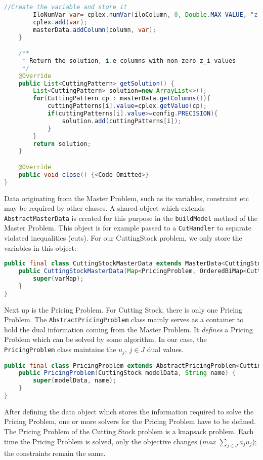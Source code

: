 \documentclass[a4paper]{article}
\newenvironment{myblock}[1]{%
    \tcolorbox[beamer,%
    noparskip,breakable,
    colback=lightBlueCodeBlock,colframe=darkBlueCodeBlock,%
    colbacklower=darkBlueCodeBlock!75!lightBlueCodeBlock,%
    coltitle=blueTitleCodeBlock,
    title=#1]}%
    {\endtcolorbox}
\newcommand{\code}[1]{\lstinline[language=java, style=seminar]!#1!}
\begin{document}
\begin{myblock}{Master}
\begin{lstlisting}[language=java, style=eclipseArticle, xleftmargin=2em]
		//Create the variable and store it
		IloNumVar var= cplex.numVar(iloColumn, 0, Double.MAX_VALUE, "z_"+","+masterData.getNrColumns());
		cplex.add(var);
		masterData.addColumn(column, var);
	}

	/**
	 * Return the solution, i.e columns with non-zero z_i values
	 */
	@Override
	public List<CuttingPattern> getSolution() {
		List<CuttingPattern> solution=new ArrayList<>();
		for(CuttingPattern cp : masterData.getColumns()){
			cuttingPatterns[i].value=cplex.getValue(cp);
			if(cuttingPatterns[i].value>=config.PRECISION){
				solution.add(cuttingPatterns[i]);
			}
		}
		return solution;
	}

	@Override
	public void close() {<Code Omitted>}	
}
\end{lstlisting}
\end{myblock}
Data originating from the Master Problem, such as its variables, constraint etc may be required by other classes. A shared object which extends \code{AbstractMasterData} is created for this purpose in the \code{buildModel} method of the Master Problem. This object is for example passed to a \code{CutHandler} to separate violated inequalities (cuts). For our CuttingStock problem, we only store the variables in this object:

\begin{myblock}{CuttingStockMasterData}
\begin{lstlisting}[language=java, style=eclipseArticle, xleftmargin=2em]  
public final class CuttingStockMasterData extends MasterData<CuttingStock, CuttingPattern, PricingProblem, IloNumVar>{
    public CuttingStockMasterData(Map<PricingProblem, OrderedBiMap<CuttingPattern, IloNumVar>> varMap) {
        super(varMap);
    }
}
\end{lstlisting}
\end{myblock}

Next up is the Pricing Problem. For Cutting Stock, there is only one Pricing Problem.  The \code{AbstractPricingProblem} class mainly serves as a container to hold the dual information coming from the Master Problem. It \emph{defines} a Pricing Problem which can be solved by some algorithm. In our case, the \code{PricingProblem} class maintains the $u_j$, $j\in J$ dual values.
\begin{myblock}{PricingProblem}
\begin{lstlisting}[language=java, style=eclipseArticle, xleftmargin=2em]  
public final class PricingProblem extends AbstractPricingProblem<CuttingStock> {
	public PricingProblem(CuttingStock modelData, String name) {
		super(modelData, name);
	}
}
\end{lstlisting}
\end{myblock}
After defining the data object which stores the information required to solve the Pricing Problem, one or more solvers for the Pricing Problem have to be defined. The Pricing Problem of the Cutting Stock problem is a knapsack problem. Each time the Pricing Problem is solved, only the objective changes ($max\; \sum_{j\in J} a_ju_j$); the constraints remain the same.
\end{document}
